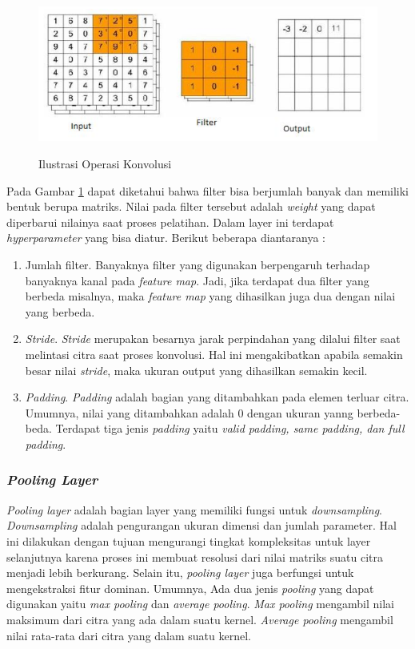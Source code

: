 \begin{figure} [ht] \centering  
  \includegraphics[scale=0.9]{gambar/convolution-operation.png}
  \caption{Ilustrasi Operasi Konvolusi}
  \label{fig:Ilustrasi Operasi Konvolusi}
  \parencite{MaxPoolingLayer}
\end{figure}

Pada Gambar \ref{fig:Ilustrasi Operasi Konvolusi} dapat diketahui bahwa filter bisa berjumlah banyak dan memiliki bentuk berupa matriks. Nilai pada filter tersebut adalah \emph{weight} yang dapat diperbarui nilainya saat proses pelatihan. Dalam layer ini terdapat \emph{hyperparameter} yang bisa diatur. Berikut beberapa diantaranya :

\begin{enumerate}[nolistsep]
  \item Jumlah filter. Banyaknya filter yang digunakan berpengaruh terhadap banyaknya kanal pada \emph{feature map}. Jadi, jika terdapat dua filter yang berbeda misalnya, maka \emph{feature map} yang dihasilkan juga dua dengan nilai yang berbeda.
  \item \emph{Stride}. \emph{Stride} merupakan besarnya jarak perpindahan yang dilalui filter saat melintasi citra saat proses konvolusi. Hal ini mengakibatkan apabila semakin besar nilai \emph{stride}, maka ukuran output yang dihasilkan semakin kecil. 
  \item \emph{Padding}. \emph{Padding} adalah bagian yang ditambahkan pada elemen terluar citra. Umumnya, nilai yang ditambahkan adalah 0 dengan ukuran yanng berbeda-beda. Terdapat tiga jenis \emph{padding} yaitu \emph{valid padding, same padding, dan full padding}. 
\end{enumerate}   

\subsubsection{\emph{Pooling Layer}}
\emph{Pooling layer} adalah bagian layer yang memiliki fungsi untuk \emph{downsampling}. \emph{Downsampling} adalah pengurangan ukuran dimensi dan jumlah parameter. Hal ini dilakukan dengan tujuan mengurangi tingkat kompleksitas untuk layer selanjutnya karena proses ini membuat resolusi dari nilai matriks suatu citra menjadi lebih berkurang. Selain itu, \emph{pooling layer} juga berfungsi untuk mengekstraksi fitur dominan. Umumnya, Ada dua jenis \emph{pooling} yang dapat digunakan yaitu \emph{max pooling} dan \emph{average pooling}. \emph{Max pooling} mengambil nilai maksimum dari citra yang ada dalam suatu kernel. \emph{Average pooling} mengambil nilai rata-rata dari citra yang dalam suatu kernel. 

